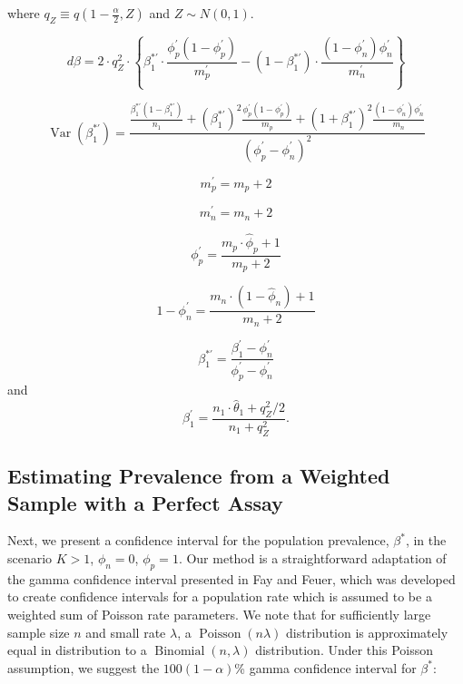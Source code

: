 \documentclass[AMA,STIX1COL]{WileyNJD-v2}
\DeclareMathOperator{\Var}{Var}
\begin{document}
where \( q_Z \equiv q\left( 1 - \frac{\alpha}{2}, Z \right)\) and \( Z \sim N(0,1) \).

\begin{equation*}
    d\beta = 2 \cdot q_Z^2 \cdot\left\{ \beta_1^{*\prime} \cdot \frac{\phi_p^\prime (1 - \phi_p^\prime)}{m_p^\prime} - (1 - \beta_1^{*\prime}) \cdot \frac{(1 - \phi_n^\prime) \phi_n^\prime}{m_n^\prime}  \right\}
\end{equation*}

\begin{equation*}
    \Var(\beta_1^{*\prime}) = \frac{ \frac{\beta_1^{*\prime}(1 - \beta_1^{*\prime})}{n_1} + \left(\beta_1^{*\prime}\right)^2 \frac{\phi_p^\prime (1 - \phi_p^\prime)}{m_p} + \left(1 + \beta_1^{*\prime}\right)^2 \frac{(1 - \phi_n^\prime) \phi_n^\prime}{ m_n}}{(\phi_p^\prime - \phi_n^\prime)^2}
\end{equation*}

\begin{equation*}
    m_p^\prime = m_p +2
\end{equation*}

\begin{equation*}
    m_n^\prime = m_n + 2
\end{equation*}

\begin{equation*}
    \phi_p^\prime = \frac{m_p \cdot \hat{\phi}_p + 1}{m_p + 2}
\end{equation*}

\begin{equation*}
   1 - \phi_n^\prime = \frac{m_n \cdot (1 - \hat{\phi}_n) + 1}{m_n + 2} 
\end{equation*}

\begin{equation*}
   \beta_1^{*\prime} = \frac{\beta_1^\prime - \phi_n^\prime}{\phi_p^\prime - \phi_n^\prime} 
\end{equation*}
and 
\begin{equation*}
    \beta_1^\prime = \frac{n_1 \cdot \hat{\theta}_1 + q_Z^2 / 2}{n_1 + q_Z^2}.
\end{equation*}

\subsection{Estimating Prevalence from a Weighted Sample with a Perfect Assay}
\label{sec:weight-perfect}

Next, we present a confidence interval for the population prevalence, \( \beta^* \), in the scenario \( K > 1 \), \( \phi_n = 0 \), \( \phi_p = 1 \).
Our method is a straightforward adaptation of the gamma confidence interval presented in Fay and Feuer\cite{FayF:1997}, which was developed to create confidence intervals for a population rate which is assumed to be a weighted sum of Poisson rate parameters.
We note that for sufficiently large sample size \( n \) and small rate \( \lambda \), a \( \operatorname{Poisson}(n\lambda) \) distribution is approximately equal in distribution to a \( \operatorname{Binomial}(n, \lambda) \) distribution.
Under this Poisson assumption, we suggest the \( 100(1 - \alpha) \)\% gamma confidence interval for \( \beta^* \):
\end{document}
